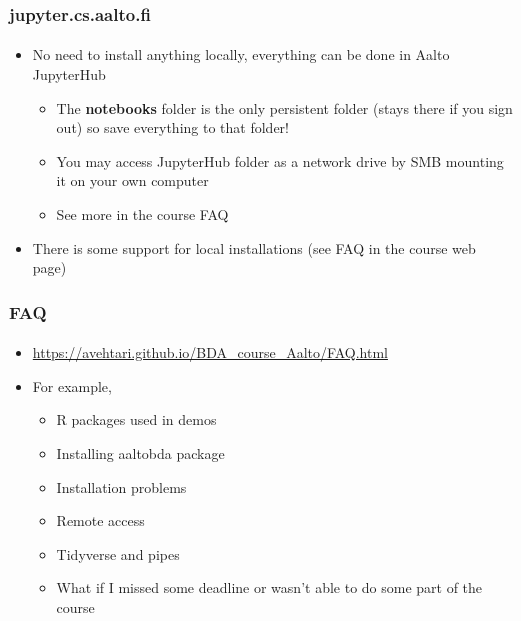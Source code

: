 \documentclass[english,t]{beamer}
\begin{document}
\begin{frame}

  \frametitle{jupyter.cs.aalto.fi}  %
  \framesubtitle{}

  \begin{itemize}
  \item No need to install anything locally, everything can be done in
    Aalto JupyterHub
    \begin{itemize}
    \item The \textbf{notebooks} folder is the only persistent folder
      (stays there if you sign out) so save everything to that folder!
    \item You may access JupyterHub folder as a network drive by SMB
      mounting it on your own computer
    \item See more in the course FAQ
    \end{itemize}
  \item There is some support for local installations (see FAQ in the
    course web page)
  \end{itemize}
  
\end{frame}  

\begin{frame}

  \frametitle{FAQ}  %
  \framesubtitle{}

  \begin{itemize}
  \item {\small\url{https://avehtari.github.io/BDA_course_Aalto/FAQ.html}}
  \item For example,
    \begin{itemize}
    \item R packages used in demos
    \item Installing aaltobda package
    \item Installation problems
    \item Remote access
    \item Tidyverse and pipes
    \item What if I missed some deadline or wasn’t able to do some part of the course
    \end{itemize}
  \end{itemize}
  
\end{frame}  
\end{document}
